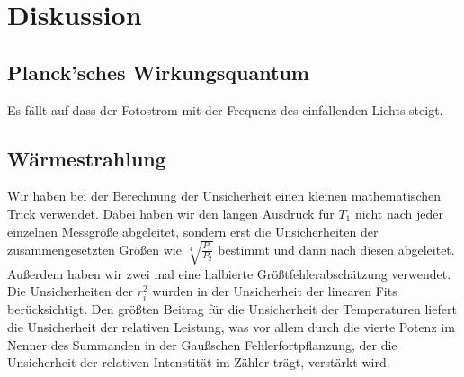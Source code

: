\documentclass[12pt]{article}
\begin{document}
\section{Diskussion}
\subsection{Planck'sches Wirkungsquantum}
Es fällt auf dass der Fotostrom mit der Frequenz des einfallenden Lichts steigt.
\subsection{Wärmestrahlung}
Wir haben bei der Berechnung der Unsicherheit einen kleinen mathematischen Trick verwendet. Dabei haben wir den langen Ausdruck für $T_1$ nicht nach jeder einzelnen Messgröße abgeleitet, sondern erst die Unsicherheiten der zusammengesetzten Größen wie $\sqrt[4]{\frac{P_1}{P_2}}$ bestimmt und dann nach diesen abgeleitet. Außerdem haben wir zwei mal eine halbierte Größtfehlerabschätzung verwendet. \\
Die Unsicherheiten der $r_i^2$ wurden in der Unsicherheit der linearen Fits berücksichtigt. Den größten Beitrag für die Unsicherheit der Temperaturen liefert die Unsicherheit der relativen Leistung, was vor allem durch die vierte Potenz im Nenner des Summanden in der Gaußschen Fehlerfortpflanzung, der die Unsicherheit der relativen Intenstität im Zähler trägt, verstärkt wird. \\
																							
\end{document}
